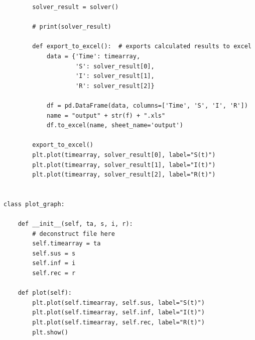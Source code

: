 \documentclass[11pt, a4paper]{article}
\begin{document}
\begin{lstlisting}
        solver_result = solver()

        # print(solver_result)

        def export_to_excel():  # exports calculated results to excel
            data = {'Time': timearray,
                    'S': solver_result[0],
                    'I': solver_result[1],
                    'R': solver_result[2]}

            df = pd.DataFrame(data, columns=['Time', 'S', 'I', 'R'])
            name = "output" + str(f) + ".xls"
            df.to_excel(name, sheet_name='output')

        export_to_excel()
        plt.plot(timearray, solver_result[0], label="S(t)")
        plt.plot(timearray, solver_result[1], label="I(t)")
        plt.plot(timearray, solver_result[2], label="R(t)")


class plot_graph:

    def __init__(self, ta, s, i, r):
        # deconstruct file here
        self.timearray = ta
        self.sus = s
        self.inf = i
        self.rec = r

    def plot(self):
        plt.plot(self.timearray, self.sus, label="S(t)")
        plt.plot(self.timearray, self.inf, label="I(t)")
        plt.plot(self.timearray, self.rec, label="R(t)")
        plt.show()
    
\end{lstlisting}
\end{document}
